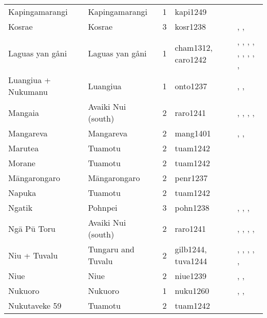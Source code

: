 \begin{longtable}{p{3cm}p{3cm}p{2cm}p{2cm}p{4cm}}
  Kapingamarangi & Kapingamarangi & 1 & kapi1249 & \citet{buck1950} \\ 
  Kosrae & Kosrae & 3 & kosr1238 & \citet{athens2007prehistoric}, \citet{graves1986late}, \citet{peoples1991} \\ 
  Laguas yan gåni & Laguas yan gåni & 1 & cham1312, caro1242 & \citet{cordy1983social}, \citet{cordy1983social}, \citet{cordy1983social}, \citet{thompson_1971}, \citet{thompson_1971}, \citet{thompson_1971}, \citet{josephandmurray1951}, \citet{josephandmurray1951}, \citet{spehr1954}, \citet{spehr1954} \\ 
  Luangiua + Nukumanu & Luangiua & 1 & onto1237 & \citet{sahlins1958social}, \citet{bayliss1974constraints}, \citet{donner1991} \\ 
  Mangaia & Avaiki Nui (south) & 2 & raro1241 & \citet{bellwood1971varieties}, \citet{buck1934}, \citet{crocombe_1967}, \citet{hayes1981cook}, \citet{walter1996} \\ 
  Mangareva & Mangareva & 2 & mang1401 & \citet{buck1938}, \citet{conte2004archaeological}, \citet{green2000mangarevan} \\ 
  Marutea & Tuamotu & 2 & tuam1242 & \citet{emory1975material} \\ 
  Morane & Tuamotu & 2 & tuam1242 & \citet{emory1975material} \\ 
  Māngarongaro & Māngarongaro & 2 & penr1237 & \citet{buck1932b} \\ 
  Napuka & Tuamotu & 2 & tuam1242 & \citet{emory1975material} \\ 
  Ngatik & Pohnpei & 3 & pohn1238 & \citet{hanlon2019upon}, \citet{haun1984prehistoric}, \citet{raynor1991indigenous}, \citet{riesenberg1968native} \\ 
  Ngā Pū Toru & Avaiki Nui (south) & 2 & raro1241 & \citet{bellwood1971varieties}, \citet{buck1934}, \citet{crocombe_1967}, \citet{hayes1981cook}, \citet{walter1996} \\ 
  Niu + Tuvalu & Tungaru and Tuvalu & 2 & gilb1244, tuva1244 & \citet{lambert1966}, \citet{lambert1975makin}, \citet{lambert1991}, \citet{macdonald1982cinderellas}, \citet{macdonald1982cinderellas}, \citet{goldsmith1991} \\ 
  Niue & Niue & 2 & niue1239 & \citet{loeb1978}, \citet{smith1983niue}, \citet{walter_anderson1995} \\ 
  Nukuoro & Nukuoro & 1 & nuku1260 & \citet{carroll1966nukuoro}, \citet{carroll1975pacific}, \citet{eilers_1934} \\ 
  Nukutaveke 59 & Tuamotu & 2 & tuam1242 & \citet{emory1975material} \\ 

\end{longtable}
